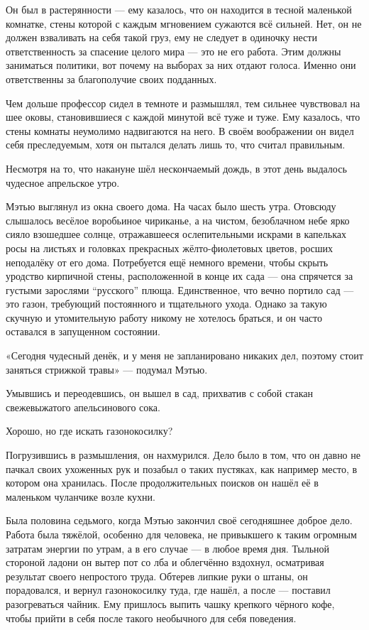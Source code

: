 \documentclass[a5paper, 9pt,
final, openany, twoside=true]{memoir}
\begin{document}
Он был в растерянности — ему казалось, что он находится в тесной маленькой комнатке, стены которой с каждым мгновением сужаются всё сильней. Нет, он не должен взваливать на себя такой груз, ему не следует в одиночку нести ответственность за спасение целого мира — это не его работа. Этим должны заниматься политики, вот почему на выборах за них отдают голоса. Именно они ответственны за благополучие своих подданных.

Чем дольше профессор сидел в темноте и размышлял, тем сильнее чувствовал на шее оковы, становившиеся с каждой минутой всё туже и туже. Ему казалось, что стены комнаты неумолимо надвигаются на него. В своём воображении он видел себя преследуемым, хотя он пытался делать лишь то, что считал правильным.\bigskip

Несмотря на то, что накануне шёл нескончаемый дождь, в этот день выдалось чудесное апрельское утро.

Мэтью выглянул из окна своего дома. На часах было шесть утра. Отовсюду слышалось весёлое воробьиное чириканье, а на чистом, безоблачном небе ярко сияло взошедшее солнце, отражавшееся ослепительными искрами в капельках росы на листьях и головках прекрасных жёлто-фиолетовых цветов, росших неподалёку от его дома. Потребуется ещё немного времени, чтобы скрыть уродство кирпичной стены, расположенной в конце их сада — она спрячется за густыми зарослями ``русского'' плюща. Единственное, что вечно портило сад — это газон, требующий постоянного и тщательного ухода. Однако за такую скучную и утомительную работу никому не хотелось браться, и он часто оставался в запущенном состоянии.

«Сегодня чудесный денёк, и у меня не запланировано никаких дел, поэтому стоит заняться стрижкой травы» — подумал Мэтью.

Умывшись и переодевшись, он вышел в сад, прихватив с собой стакан свежевыжатого апельсинового сока.

Хорошо, но где искать газонокосилку?

Погрузившись в размышления, он нахмурился. Дело было в том, что он давно не пачкал своих ухоженных рук и позабыл о таких пустяках, как например место, в котором она хранилась. После продолжительных поисков он нашёл её в маленьком чуланчике возле кухни.\bigskip

Была половина седьмого, когда Мэтью закончил своё сегодняшнее доброе дело. Работа была тяжёлой, особенно для человека, не привыкшего к таким огромным затратам энергии по утрам, а в его случае — в любое время дня. Тыльной стороной ладони он вытер пот со лба и облегчённо вздохнул, осматривая результат своего непростого труда. Обтерев липкие руки о штаны, он порадовался, и вернул газонокосилку туда, где нашёл, а после — поставил разогреваться чайник. Ему пришлось выпить чашку крепкого чёрного кофе, чтобы прийти в себя после такого необычного для себя поведения.
\end{document}
